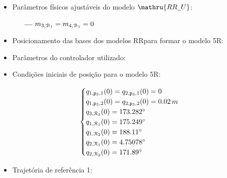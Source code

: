 \begin{itemize}
\item Par\^ametros físicos ajustáveis do modelo $\mathru{RR{\ud}U}$:

\begin{itemize}
\item[\bf \----] $m_{3, \mathcal{B}_1} = m_{4, \mathcal{B}_1} = 0$
\end{itemize}


\item Posicionamento das bases dos modelos RR\ud para formar o modelo 5R\ud:

\begin{itemize}
\end{itemize}

\item Par\^ametros do controlador utilizado:

\begin{itemize}
\end{itemize}

\item Condi\c{c}\~oes iniciais de posi\c{c}\~ao para o modelo 5R\ud:

$$\begin{cases}
q_{1,\mathtt{p}_3,1}(0) = q_{2,\mathtt{p}_3,1}(0) = 0 \\
q_{1,\mathtt{p}_3,2}(0) = q_{2,\mathtt{p}_3,2}(0) = 0.02 \,m \\
q_{3, \mathcal{R}_3}(0) = 173.282^\circ \\
q_{1,\mathcal{R}_1}(0) = 175.249^\circ \\
q_{1,\mathcal{R}_2}(0) = 188.11^\circ \\
q_{2,\mathcal{R}_1}(0) = 4.75078^\circ \\
q_{2,\mathcal{R}_2}(0) = 171.89^\circ \\
\end{cases}$$

\item Trajet\'oria de refer\^encia 1:


\end{itemize}
